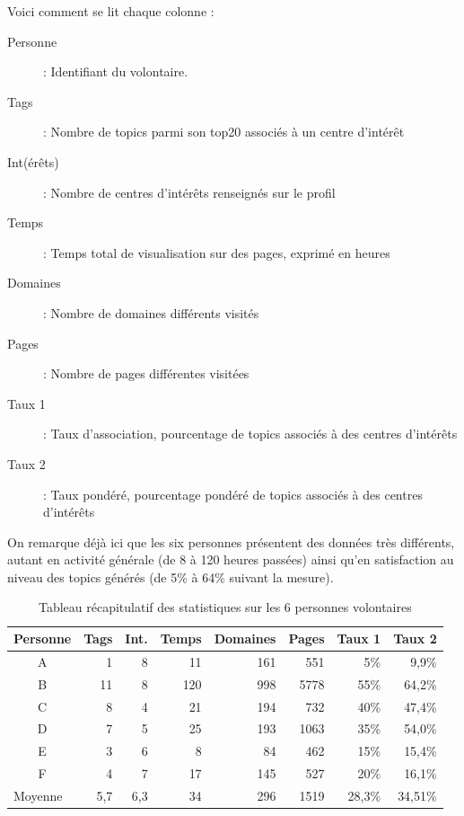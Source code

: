 			Voici comment se lit chaque colonne :
			\begin{description}
				\item[Personne] : Identifiant du volontaire.
				\item[Tags] : Nombre de topics parmi son top20 associés à un centre d'intérêt
				\item[Int(érêts)] : Nombre de centres d'intérêts renseignés sur le profil
				\item[Temps] : Temps total de visualisation sur des pages, exprimé en heures
				\item[Domaines] : Nombre de domaines différents visités
				\item[Pages] : Nombre de pages différentes visitées
				\item[Taux 1] : Taux d'association, pourcentage de topics associés à des centres d'intérêts
				\item[Taux 2] : Taux pondéré, pourcentage pondéré de topics associés à des centres d'intérêts
			\end{description}

			On remarque déjà ici que les six personnes présentent des données très différents, autant en activité générale (de 8 à 120 heures passées) ainsi qu'en satisfaction au niveau des topics générés (de 5\% à 64\% suivant la mesure). 

			\begin{table}[]
\centering
\begin{tabular}{crrrrrrr}
\multicolumn{1}{l}{\textbf{Personne}} & \multicolumn{1}{l}{\textbf{Tags}} & \multicolumn{1}{l}{\textbf{Int.}} & \multicolumn{1}{l}{\textbf{Temps}} & \multicolumn{1}{l}{\textbf{Domaines}} & \multicolumn{1}{l}{\textbf{Pages}} & \multicolumn{1}{l}{\textbf{Taux 1}} & \multicolumn{1}{l}{\textbf{Taux 2}} \\ \hline
A & 1 & 8 & 11 & 161 & 551 & 5\% & 9,9\% \\
B & 11 & 8 & 120 & 998 & 5778 & 55\% & 64,2\% \\
C & 8 & 4 & 21 & 194 & 732 & 40\% & 47,4\% \\
D & 7 & 5 & 25 & 193 & 1063 & 35\% & 54,0\% \\
E & 3 & 6 & 8 & 84 & 462 & 15\% & 15,4\% \\
F & 4 & 7 & 17 & 145 & 527 & 20\% & 16,1\% \\ \hline
\multicolumn{1}{l}{Moyenne} & 5,7 & 6,3 & 34 & 296 & 1519 & 28,3\% & 34,51\%
\end{tabular}
\caption{Tableau récapitulatif des statistiques sur les 6 personnes volontaires}
\label{profiles-table}
\end{table}

